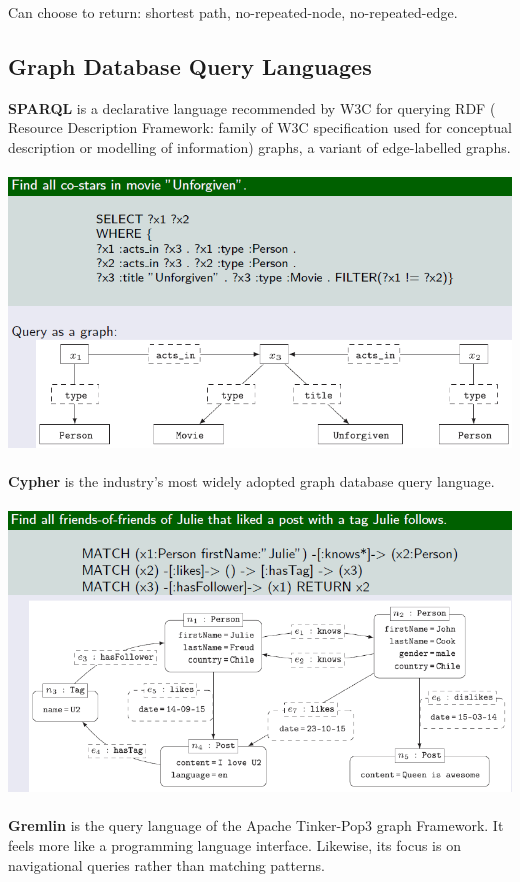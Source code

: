 \documentclass{article}
\begin{document}
Can choose to return: shortest path, no-repeated-node, no-repeated-edge.

\subsection{Graph Database Query Languages}
\textbf{SPARQL } is a declarative language recommended by W3C for querying RDF ( Resource Description Framework: family of W3C specification used for conceptual description or modelling of information) graphs, a variant of edge-labelled graphs.\\\\
\includegraphics[scale=0.6]{27.png}\\\\
\textbf{Cypher} is the industry's most widely adopted graph database query language.\\\\
\includegraphics[scale=0.6]{28.png}\\\\
\textbf{Gremlin }is the query language of the Apache Tinker-Pop3 graph Framework.
It feels more like a programming language interface. Likewise, its focus is on navigational queries rather than matching patterns.\\\\
\end{document}

